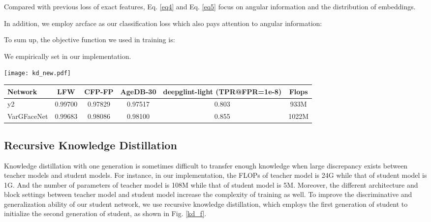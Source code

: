 \documentclass[10pt,twocolumn,letterpaper]{article}
\begin{document}
Compared with previous  loss of exact features, Eq. \ref{eq4} and Eq. \ref{eq5} focus on angular information and the distribution of embeddings.

In addition, we employ arcface \cite{arcface} as our classification loss which also pays attention to angular information:



To sum up, the objective function we used in training is:



We empirically set  in our implementation.
\begin{figure*}[htb]
	\begin{center}
		\texttt{[image: kd\_new.pdf]}
	\end{center}
	\caption{The process of recursive knowledge distillation. We apply the first generation of student to initialize the second generation of student while the teacher model is remained. Angular distillation loss and arcface loss are used to guide training. }
\label{kd_f}
\end{figure*}

\begin{table*}
	\begin{center}
		\setlength{\tabcolsep}{5mm}
		\begin{tabular}{l|c|c|c|c|c}
			\hline
			\hline
			Network & LFW & CFP-FP & AgeDB-30 & deepglint-light (TPR@FPR=1e-8) & Flops \\
			\hline
			y2      & 0.99700 & 0.97829 & 0.97517 & 0.803     & 933M \\
			\hline
			VarGFaceNet & 0.99683 & 0.98086 & 0.98100 & 0.855     & 1022M  \\
			\hline
			\hline
		\end{tabular}
	\end{center}
	\caption{VarGFaceNet vs. y2. Performance is recorded within the same epoch. The validation performance of VarGFaceNet is 0.6\% and 0.2\% higher than y2 on AgeDB-30 and CFP-FP respectively. Testing result of VarGFaceNet is 5\% higher than y2.}
	\label{scratch}
\end{table*}
\subsection{Recursive Knowledge Distillation}
\label{sec:kd}
Knowledge distillation with one generation is sometimes difficult to transfer enough knowledge when large discrepancy exists between teacher models and student models. For instance, in our implementation, the FLOPs of teacher model is 24G while that of student model is 1G. And the number of parameters of teacher model is 108M while that of student model is 5M. Moreover, the different architecture and block settings between teacher model and student model increase the complexity of training as well. To improve the discriminative and generalization ability of our student network, we use recursive knowledge distillation, which employs the first generation of student to initialize the second generation of student, as shown in Fig. \ref{kd_f}.
\end{document}

